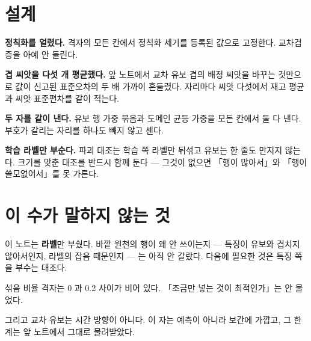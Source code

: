 \documentclass[10pt]{article}
\begin{document}
\section{설계}

\textbf{정칙화를 얼렸다.} 격자의 모든 칸에서 정칙화 세기를 등록된 값으로 고정한다.
교차검증을 아예 안 돌린다.

\textbf{겹 씨앗을 다섯 개 평균했다.} 앞 노트에서 교차 유보 겹의 배정 씨앗을 바꾸는 것만으로
값이 신고된 표준오차의 두 배 가까이 흔들렸다. 자리마다 씨앗 다섯에서 재고 평균과
씨앗 표준편차를 같이 적는다.

\textbf{두 자를 같이 낸다.} 유보 행 가중 묶음과 도메인 균등 가중을 모든 칸에서 둘 다 낸다.
부호가 갈리는 자리를 하나도 빼지 않고 센다.

\textbf{학습 라벨만 부순다.} 파괴 대조는 학습 쪽 라벨만 뒤섞고 유보는 한 줄도 만지지 않는다.
크기를 맞춘 대조를 반드시 함께 둔다 --- 그것이 없으면 「행이 많아서」와 「행이 쓸모없어서」를
못 가른다.



\section{이 수가 말하지 않는 것}

이 노트는 \textbf{라벨}만 부쉈다. 바깥 원천의 행이 왜 안 쓰이는지 --- 특징이 유보와
겹치지 않아서인지, 라벨의 잡음 때문인지 --- 는 아직 안 갈랐다. 다음에 필요한 것은
특징 쪽을 부수는 대조다.

섞음 비율 격자는 0 과 0.2 사이가 비어 있다. 「조금만 넣는 것이 최적인가」는 안 물었다.

그리고 교차 유보는 시간 방향이 아니다. 이 자는 예측이 아니라 보간에 가깝고,
그 한계는 앞 노트에서 그대로 물려받았다.
\end{document}
